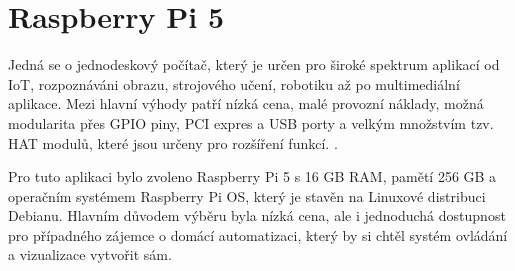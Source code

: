 \chapter{Raspberry Pi 5}
Jedná se o jednodeskový počítač, který je určen pro široké spektrum aplikací od IoT, rozpoznáváni obrazu, strojového učení, robotiku až po multimediální aplikace. Mezi hlavní výhody patří nízká cena, malé provozní náklady, možná modularita přes GPIO piny, PCI expres a USB porty a velkým množstvím tzv. HAT modulů, které jsou určeny pro rozšíření funkcí. \cite{Raspberry Pi 5}.

Pro tuto aplikaci bylo zvoleno Raspberry Pi 5 s 16 GB RAM, pamětí 256 GB a operačním systémem Raspberry Pi OS, který je stavěn na Linuxové distribuci Debianu. Hlavním důvodem výběru byla nízká cena, ale i jednoduchá dostupnost pro případného zájemce o domácí automatizaci, který by si chtěl systém ovládání a vizualizace vytvořit sám.


